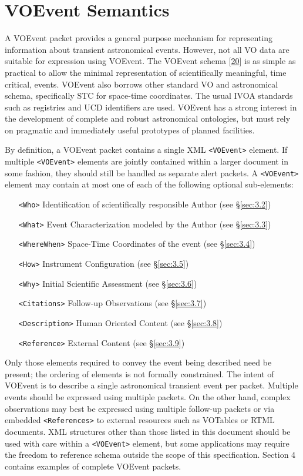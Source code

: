 \documentclass[11pt,a4paper]{ivoa}
\begin{document}
\section{VOEvent Semantics}
\label{sec:3}
A VOEvent packet provides a general purpose mechanism for representing information about transient astronomical events. However, not all VO data are suitable for expression using VOEvent. The VOEvent schema [\hyperref[bib20]{20}] is as simple as practical to allow the minimal representation of scientifically meaningful, time critical, events. VOEvent also borrows other standard VO and astronomical schema, specifically STC for space-time coordinates. The usual IVOA standards such as registries and UCD identifiers are used. VOEvent has a strong interest in the development of complete and robust astronomical ontologies, but must rely on pragmatic and immediately useful prototypes of planned facilities. 

By definition, a VOEvent packet contains a single XML {\tt <VOEvent>} element. If multiple {\tt <VOEvent>} elements are jointly contained within a larger document in some fashion, they should still be handled as separate alert packets. A {\tt <VOEvent>} element may contain at most one of each of the following optional sub-elements:
\begin{itemize}
\item[\tt <Who>] Identification of scientifically responsible Author (see \S\ref{sec:3.2})
\item[\tt <What>] Event Characterization modeled by the Author (see \S\ref{sec:3.3})
\item[\tt <WhereWhen>] Space-Time Coordinates of the event (see \S\ref{sec:3.4})
\item[\tt <How>] Instrument Configuration (see \S\ref{sec:3.5})
\item[\tt <Why>] Initial Scientific Assessment (see \S\ref{sec:3.6})
\item[\tt <Citations>] Follow-up Observations (see \S\ref{sec:3.7})
\item[\tt <Description>] Human Oriented Content (see \S\ref{sec:3.8})
\item[\tt <Reference>] External Content (see \S\ref{sec:3.9})
\end{itemize}

Only those elements required to convey the event being described need be present; the ordering of elements is not formally constrained. The intent of VOEvent is to describe a single astronomical transient event per packet. Multiple events should be expressed using multiple packets. On the other hand, complex observations may best be expressed using multiple follow-up packets or via embedded {\tt <References>} to external resources such as VOTables or RTML documents. XML structures other than those listed in this document should be used with care within a {\tt <VOEvent>} element, but some applications may require the freedom to reference schema outside the scope of this specification. Section 4 contains examples of complete VOEvent packets. 
\end{document}
